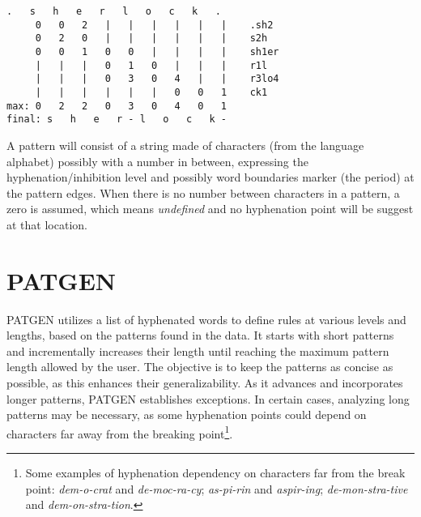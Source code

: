 \documentclass{article}
\begin{document}
\noindent\begin{minipage}{\linewidth}
\begin{lstlisting}[language={}, caption={Example of rules applyied in the
hyphenation of the word \emph{Sherlock}. Example done using a port of \TeX{}'s
hyphenation algorithm to Go provided at
\url{https://github.com/speedata/hyphenation}.}, label=sherlockhyphenation]
   .   s   h   e   r   l   o   c   k   .
     0   0   2   |   |   |   |   |   |    .sh2
     0   2   0   |   |   |   |   |   |    s2h
     0   0   1   0   0   |   |   |   |    sh1er
     |   |   |   0   1   0   |   |   |    r1l
     |   |   |   0   3   0   4   |   |    r3lo4
     |   |   |   |   |   |   0   0   1    ck1
max: 0   2   2   0   3   0   4   0   1
final: s   h   e   r - l   o   c   k -
\end{lstlisting}
\end{minipage}

A pattern will consist of a string made of characters (from the language
alphabet) possibly with a number in between, expressing the
hyphenation/inhibition level and possibly word boundaries marker (the period)
at the pattern edges. When there is no number between characters in a pattern,
a zero is assumed, which means \emph{undefined} and no hyphenation point will
be suggest at that location.



\section{PATGEN}\label{sec-patgen} 

PATGEN utilizes a list of hyphenated words to define rules at various levels
and lengths, based on the patterns found in the data. It starts with short
patterns and incrementally increases their length until reaching the maximum
pattern length allowed by the user.  The objective is to keep the patterns as
concise as possible, as this enhances their generalizability.  As it advances
and incorporates longer patterns, PATGEN establishes exceptions.  In certain
cases, analyzing long patterns may be necessary, as some hyphenation points
could depend on characters far away from the breaking point\footnote{Some
    examples of hyphenation dependency on characters far from the break point:
    \emph{dem-o-crat} and \emph{de-moc-ra-cy}; \emph{as-pi-rin} and
    \emph{aspir-ing}; \emph{de-mon-stra-tive} and \emph{dem-on-stra-tion}.
}.
\end{document}

